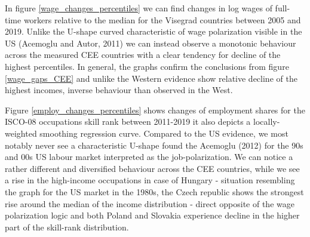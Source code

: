 \documentclass{article}
\begin{document}
In figure \ref{wage_changes_percentiles} we can find changes in log wages of full-time workers relative to the median for the Visegrad countries between 2005 and 2019. Unlike the U-shape curved characteristic of wage polarization visible in the US (Acemoglu and Autor, 2011) we can instead observe a monotonic behaviour across the measured CEE countries with a clear tendency for decline of the highest percentiles. In general, the graphs confirm the conclusions from figure \ref{wage_gaps_CEE} and unlike the Western evidence show relative decline of the highest incomes, inverse behaviour than observed in the West.

Figure \ref{employ_changes_percentiles} shows changes of employment shares for the ISCO-08 occupations skill rank between 2011-2019 it also depicts a locally-weighted smoothing regression curve. Compared to the US evidence, we most notably never see a characteristic U-shape found the Acemoglu (2012) for the 90s and 00s US labour market interpreted as the job-polarization. We can notice a rather different and diversified behaviour across the CEE countries, while we see a rise in the high-income occupations in case of Hungary - situation resembling the graph for the US market in the 1980s, the Czech republic shows the strongest rise around the median of the income distribution - direct opposite of the wage polarization logic and both Poland and Slovakia experience decline in the higher part of the skill-rank distribution.
\end{document}
